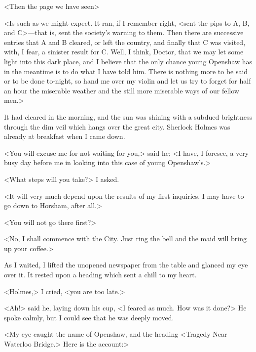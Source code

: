 <Then the page we have seen\longdash>

<Is such as we might expect. It ran, if I remember right, <sent the pips to A, B, and C>—that is, sent the society's warning to them. Then there are successive entries that A and B cleared, or left the country, and finally that C was visited, with, I fear, a sinister result for C\@. Well, I think, Doctor, that we may let some light into this dark place, and I believe that the only chance young Openshaw has in the meantime is to do what I have told him. There is nothing more to be said or to be done to-night, so hand me over my violin and let us try to forget for half an hour the miserable weather and the still more miserable ways of our fellow men.>

It had cleared in the morning, and the sun was shining with a subdued brightness through the dim veil which hangs over the great city. Sherlock Holmes was already at breakfast when I came down.

<You will excuse me for not waiting for you,> said he; <I have, I foresee, a very busy day before me in looking into this case of young Openshaw's.>

<What steps will you take?> I asked.

<It will very much depend upon the results of my first inquiries. I may have to go down to Horsham, after all.>

<You will not go there first?>

<No, I shall commence with the City. Just ring the bell and the maid will bring up your coffee.>

As I waited, I lifted the unopened newspaper from the table and glanced my eye over it. It rested upon a heading which sent a chill to my heart.

<Holmes,> I cried, <you are too late.>

<Ah!> said he, laying down his cup, <I feared as much. How was it done?> He spoke calmly, but I could see that he was deeply moved.

<My eye caught the name of Openshaw, and the heading <Tragedy Near Waterloo Bridge.> Here is the account:>

